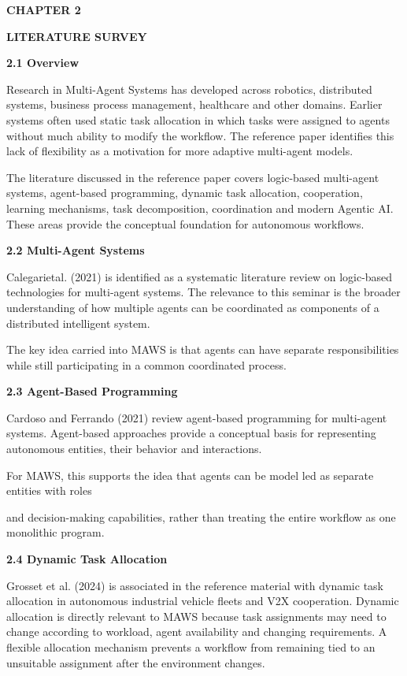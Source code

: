 \documentclass[12pt,letterpaper]{article}
\newcommand{\chaptertitle}[2]{%
  \begin{center}
    {\fontsize{15pt}{18pt}\selectfont\bfseries #1\par}%
    \vspace{2pt}%
    {\fontsize{15pt}{18pt}\selectfont\bfseries #2\par}%
  \end{center}%
  \vspace{10pt}%
}
\newcommand{\sectiontitle}[1]{%
  \vspace{6pt}%
  {\noindent\fontsize{13.2pt}{16pt}\selectfont\bfseries #1\par}%
  \vspace{2pt}%
}
\begin{document}
\chaptertitle{CHAPTER 2}{LITERATURE SURVEY}

\sectiontitle{2.1 Overview}
Research in Multi-Agent Systems has developed across robotics, distributed systems, business process management, healthcare and other domains. Earlier systems often used static task allocation in which tasks were assigned to agents without much ability to modify the workflow. The reference paper identifies this lack of flexibility as a motivation for more adaptive multi-agent models.

The literature discussed in the reference paper covers logic-based multi-agent systems, agent-based programming, dynamic task allocation, cooperation, learning mechanisms, task decomposition, coordination and modern Agentic AI. These areas provide the conceptual foundation for autonomous workflows.

\sectiontitle{2.2 Multi-Agent Systems}
Calegarietal. (2021) is identified as a systematic literature review on logic-based technologies for multi-agent systems. The relevance to this seminar is the broader understanding of how multiple agents can be coordinated as components of a distributed intelligent system.

The key idea carried into MAWS is that agents can have separate responsibilities while still participating in a common coordinated process.

\sectiontitle{2.3 Agent-Based Programming}
Cardoso and Ferrando (2021) review agent-based programming for multi-agent systems. Agent-based approaches provide a conceptual basis for representing autonomous entities, their behavior and interactions.

For MAWS, this supports the idea that agents can be model led as separate entities with roles
\newpage

and decision-making capabilities, rather than treating the entire workflow as one monolithic program.

\sectiontitle{2.4 Dynamic Task Allocation}
Grosset et al. (2024) is associated in the reference material with dynamic task allocation in autonomous industrial vehicle fleets and V2X cooperation. Dynamic allocation is directly relevant to MAWS because task assignments may need to change according to workload, agent availability and changing requirements. A flexible allocation mechanism prevents a workflow from remaining tied to an unsuitable assignment after the environment changes.
\end{document}
